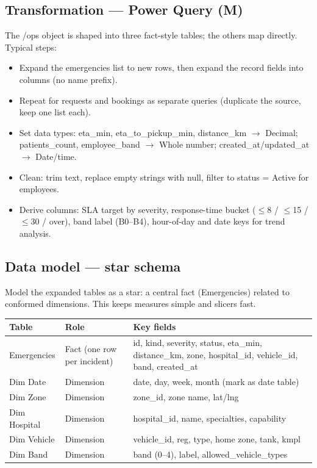 \documentclass[11pt,a4paper]{article}
\begin{document}
\subsection{Transformation --- Power Query (M)}
The /ops object is shaped into three fact-style tables; the others map directly. Typical steps:
\begin{itemize}[leftmargin=1.2em]
  \item Expand the emergencies list to new rows, then expand the record fields into columns (no name prefix).
  \item Repeat for requests and bookings as separate queries (duplicate the source, keep one list each).
  \item Set data types: eta\_min, eta\_to\_pickup\_min, distance\_km $\to$ Decimal; patients\_count, employee\_band $\to$ Whole number; created\_at/updated\_at $\to$ Date/time.
  \item Clean: trim text, replace empty strings with null, filter to status = Active for employees.
  \item Derive columns: SLA target by severity, response-time bucket ($\le$8 / $\le$15 / $\le$30 / over), band label (B0--B4), hour-of-day and date keys for trend analysis.
\end{itemize}

\subsection{Data model --- star schema}
Model the expanded tables as a star: a central fact (Emergencies) related to conformed dimensions.
This keeps measures simple and slicers fast.

\begin{tabularx}{\textwidth}{L{0.18\textwidth} L{0.22\textwidth} X}
\toprule
{}\textbf{Table} & \textbf{Role} & \textbf{Key fields} \\
\midrule
Emergencies & Fact (one row per incident) & id, kind, severity, status, eta\_min, distance\_km, zone, hospital\_id, vehicle\_id, band, created\_at \\
Dim Date & Dimension & date, day, week, month (mark as date table) \\
Dim Zone & Dimension & zone\_id, zone name, lat/lng \\
Dim Hospital & Dimension & hospital\_id, name, specialties, capability \\
Dim Vehicle & Dimension & vehicle\_id, reg, type, home zone, tank, kmpl \\
Dim Band & Dimension & band (0--4), label, allowed\_vehicle\_types \\
\bottomrule
\end{tabularx}
\end{document}
